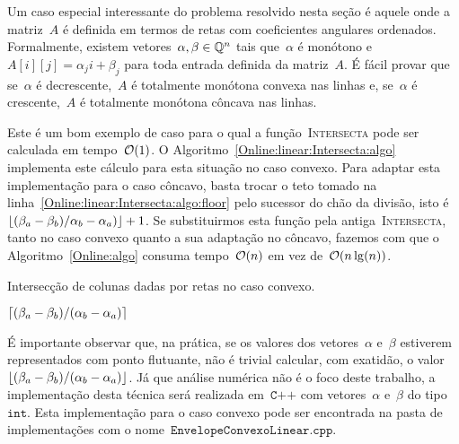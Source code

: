 Um caso especial interessante do problema resolvido nesta seção é aquele onde a matriz~$A$ é definida em termos de retas com coeficientes angulares ordenados. Formalmente, existem vetores~$\alpha,\beta \in \mathbb{Q}^n$ tais que~$\alpha$ é monótono e~$A[i][j] = \alpha_j i + \beta_j$ para toda entrada definida da matriz~$A$. É fácil provar que se~$\alpha$ é decrescente,~$A$ é totalmente monótona convexa nas linhas e, se~$\alpha$ é crescente,~$A$ é totalmente monótona côncava nas linhas.

Este é um bom exemplo de caso para o qual a função~\textsc{Intersecta} pode ser calculada em tempo~$\mathcal{O}(1)$. O Algoritmo~\ref{Online:linear:Intersecta:algo} implementa este cálculo para esta situação no caso convexo. Para adaptar esta implementação para o caso côncavo, basta trocar o teto tomado na linha~\ref{Online:linear:Intersecta:algo:floor} pelo sucessor do chão da divisão, isto é~${\lfloor(\beta_a - \beta_b)/\alpha_b - \alpha_a)\rfloor + 1}$. Se substituirmos esta função pela antiga~\textsc{Intersecta}, tanto no caso convexo quanto a sua adaptação no côncavo, fazemos com que o Algoritmo~\ref{Online:algo} consuma tempo~$\mathcal{O}(n)$ em vez de~$\mathcal{O}(n\lg(n))$.


\begin{algorithm}[h]
\caption{Intersecção de colunas dadas por retas no caso convexo. }
\label{Online:linear:Intersecta:algo}
\begin{algorithmic}[1]
    \State \Return $\lceil(\beta_a - \beta_b)/(\alpha_b - \alpha_a)\rceil$ \label{Online:linear:Intersecta:algo:floor}
\EndFunction
\end{algorithmic}
\end{algorithm}

É importante observar que, na prática, se os valores dos vetores~$\alpha$ e~$\beta$ estiverem representados com ponto flutuante, não é trivial calcular, com exatidão, o valor~$\lfloor(\beta_a - \beta_b)/(\alpha_b - \alpha_a)\rfloor$. Já que análise numérica não é o foco deste trabalho, a implementação desta técnica será realizada em~$\texttt{C++}$ com vetores~$\alpha$ e~$\beta$ do tipo~$\texttt{int}$. Esta implementação para o caso convexo pode ser encontrada na pasta de implementações com o nome~$\texttt{EnvelopeConvexoLinear.cpp}$.
